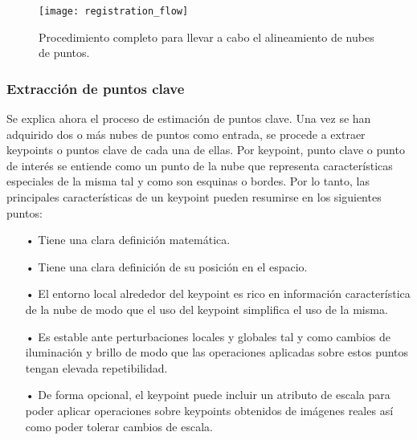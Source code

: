 \begin{figure}
\centering
\texttt{[image: registration\_flow]}
\caption{Procedimiento completo para llevar a cabo el alineamiento de nubes de puntos.}\label{fig:registration_flow}
\end{figure}

\subsubsection{Extracción de puntos clave}
Se explica ahora el proceso de estimación de puntos clave\cite{puntos_clave}. Una vez se han adquirido dos o más nubes de puntos como entrada, se procede a extraer keypoints o puntos clave de cada una de ellas. Por keypoint, punto clave o punto de interés se entiende como un punto de la nube que representa características especiales de la misma tal y como son esquinas o bordes. Por lo tanto, las principales características de un keypoint pueden resumirse en los siguientes puntos:
\begin{itemize}
\item[•] Tiene una clara definición matemática.
\item[•] Tiene una clara definición de su posición en el espacio.
\item[•] El entorno local alrededor del keypoint es rico en información característica de la nube de modo que el uso del keypoint simplifica el uso de la misma.
\item[•] Es estable ante perturbaciones locales y globales tal y como cambios de iluminación y brillo de modo que las operaciones aplicadas sobre estos puntos tengan elevada repetibilidad.
\item[•] De forma opcional, el keypoint puede incluir un atributo de escala para poder aplicar operaciones sobre keypoints obtenidos de imágenes reales así como poder tolerar cambios de escala.
\end{itemize}

